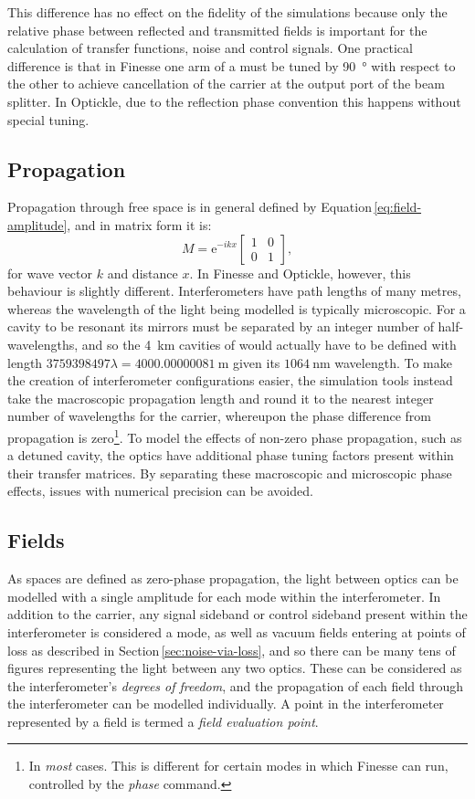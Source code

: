 This difference has no effect on the fidelity of the simulations because only the relative phase between reflected and transmitted fields is important for the calculation of transfer functions, noise and control signals. One practical difference is that in Finesse one arm of a \MI{} must be tuned by \SI{90}{\degree} with respect to the other to achieve cancellation of the carrier at the output port of the beam splitter. In Optickle, due to the reflection phase convention this happens without special tuning.

\subsection{Propagation}
Propagation through free space is in general defined by Equation\,\ref{eq:field-amplitude}, and in matrix form it is:
\begin{equation}
  M = \text{e}^{-ikx}
  \begin{bmatrix}
    1 & 0 \\
    0 & 1
  \end{bmatrix}
  ,
\end{equation}
for wave vector $k$ and distance $x$. In Finesse and Optickle, however, this behaviour is slightly different. Interferometers have path lengths of many metres, whereas the wavelength of the light being modelled is typically microscopic. For a cavity to be resonant its mirrors must be separated by an integer number of half-wavelengths, and so the \SI{4}{\kilo\meter} \FP{} cavities of \ALIGO{} would actually have to be defined with length $\num{3759398497}\lambda = \SI{4000.00000081}{\meter}$ given its $\SI{1064}{\nano\meter}$ wavelength. To make the creation of interferometer configurations easier, the simulation tools instead take the macroscopic propagation length and round it to the nearest integer number of wavelengths for the carrier, whereupon the phase difference from propagation is zero\footnote{In \emph{most} cases. This is different for certain modes in which Finesse can run, controlled by the \emph{phase} command.}. To model the effects of non-zero phase propagation, such as a detuned cavity, the optics have additional phase tuning factors present within their transfer matrices. By separating these macroscopic and microscopic phase effects, issues with numerical precision can be avoided.

\subsection{Fields}
As spaces are defined as zero-phase propagation, the light between optics can be modelled with a single amplitude for each mode within the interferometer. In addition to the carrier, any signal sideband or control sideband present within the interferometer is considered a mode, as well as vacuum fields entering at points of loss as described in Section\,\ref{sec:noise-via-loss}, and so there can be many tens of figures representing the light between any two optics. These can be considered as the interferometer's \emph{degrees of freedom}, and the propagation of each field through the interferometer can be modelled individually. A point in the interferometer represented by a field is termed a \emph{field evaluation point}.

